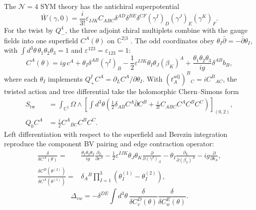 \documentclass[11pt]{article}
\numberwithin{equation}{section}
\numberwithin{figure}{section}
\numberwithin{table}{section}
\begin{document}
The $\mathcal N=4$ SYM theory has the antichiral superpotential
\begin{equation}\label{b-01022}
\bar W(\gamma,0)=\frac i{3!}\varepsilon_{IJK}C_{ABC}
\delta^{AD}\delta^{BE}\delta^{CF}(\gamma^I)_D(\gamma^J)_E(\gamma^K)_F.
\end{equation}
For the twist by $Q_-^4$, the three adjoint chiral multiplets combine with the gauge fields into one superfield $C^A(\theta)$ on $\mathbb C^{2|3}$ \cite{ChangYin,BK}. The odd coordinates obey $\theta_I\bar\partial=-\bar\partial\theta_I$, with $\int d^3\theta\,\theta_1\theta_2\theta_3=1$ and $\varepsilon^{123}=\varepsilon_{123}=1$:
\begin{equation}\label{eq-A-13}
C^A(\theta)=ig\,c^A+\theta_I\delta^{AB}(\gamma^I)_B-\frac12\varepsilon^{IJK}\theta_I\theta_J(\beta_K)^A+\frac{\theta_1\theta_2\theta_3}{ig}\delta^{AB}b_B,
\end{equation}
where each $\theta_I$ implements $Q_+^I C^A=\partial_L C^A/\partial\theta_I$. With $(t_A^{\mathrm{adj}})^B{}_C=iC^B{}_{AC}$, the twisted action and tree differential take the holomorphic Chern--Simons form
\begin{equation}\label{eq-A-15}
\begin{aligned}
S_{\mathrm{tw}}
&=\int_{\mathbb C^2}\Omega\wedge
\left[\int d^3\theta\left(
\frac12\delta_{AB}C^A\bar\partial C^B
+\frac{i}{3!}C_{ABC}C^AC^BC^C\right)\right]_{(0,2)},\\
Q_0C^A&=\frac i2C^A{}_{BC}C^BC^C.
\end{aligned}
\end{equation}
Left differentiation with respect to the superfield and Berezin integration reproduce the component BV pairing and edge contraction operator:
\begin{equation}\label{eq-A-16}
\begin{aligned}
\frac{\delta}{\delta C^A(\theta)}
={}&\frac{\theta_1\theta_2\theta_3}{ig}
\frac{\partial_L}{\partial c^A}
-\frac12\varepsilon^{IJK}\theta_J\theta_K
\frac{\partial}{\partial(\gamma^I)_A}
-\theta_I\frac{\partial_L}{\partial(\beta_I)^A}
-ig\frac{\partial}{\partial b_A},\\
\frac{\delta C^B(\theta^{(2)})}{\delta C^A(\theta^{(1)})}
={}&\delta_A{}^B\prod_{I=1}^3
(\theta_I^{(1)}-\theta_I^{(2)}),
\end{aligned}
\end{equation}
\begin{equation}\label{eq-A-17}
\Delta_{vw}=-\delta^{DE}\int d^3\theta\,\frac{\delta}{\delta C_v^D(\theta)}\frac{\delta}{\delta C_w^E(\theta)} .
\end{equation}
\end{document}
